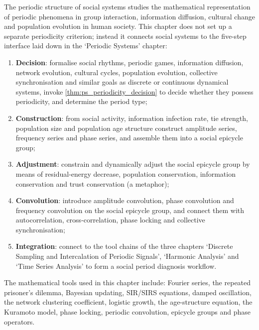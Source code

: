 \begin{remark}\label{rem:social_five_steps_positioning}
The periodic structure of social systems studies the mathematical representation of periodic phenomena in group interaction, information diffusion, cultural change and population evolution in human society. This chapter does not set up a separate periodicity criterion; instead it connects social systems to the five-step interface laid down in the `Periodic Systems' chapter:
\begin{enumerate}[label=(\arabic*)]
    \item \textbf{Decision}: formalise social rhythms, periodic games, information diffusion, network evolution, cultural cycles, population evolution, collective synchronisation and similar goals as discrete or continuous dynamical systems, invoke \cref{thm:ps_periodicity_decision} to decide whether they possess periodicity, and determine the period type;
    \item \textbf{Construction}: from social activity, information infection rate, tie strength, population size and population age structure construct amplitude series, frequency series and phase series, and assemble them into a social epicycle group;
    \item \textbf{Adjustment}: constrain and dynamically adjust the social epicycle group by means of residual-energy decrease, population conservation, information conservation and trust conservation (a metaphor);
    \item \textbf{Convolution}: introduce amplitude convolution, phase convolution and frequency convolution on the social epicycle group, and connect them with autocorrelation, cross-correlation, phase locking and collective synchronisation;
    \item \textbf{Integration}: connect to the tool chains of the three chapters `Discrete Sampling and Intercalation of Periodic Signals', `Harmonic Analysis' and `Time Series Analysis' to form a social period diagnosis workflow.
\end{enumerate}
The mathematical tools used in this chapter include: Fourier series, the repeated prisoner's dilemma, Bayesian updating, SIR/SIRS equations, damped oscillation, the network clustering coefficient, logistic growth, the age-structure equation, the Kuramoto model, phase locking, periodic convolution, epicycle groups and phase operators.
\end{remark}

